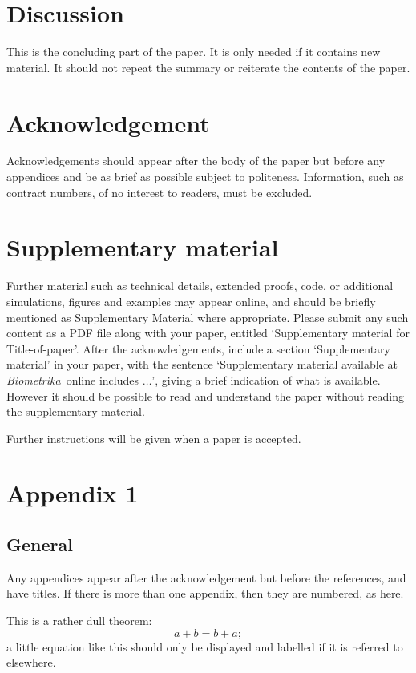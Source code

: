 \documentclass[lineno]{biometrika}
\def\Bka{{\it Biometrika}}
\begin{document}
\section{Discussion}

This is the concluding part of the paper.  It is only needed if it contains new material.
It  should not repeat the summary or reiterate the contents of the paper.

\section*{Acknowledgement}
Acknowledgements should appear after the body of the paper but before any appendices and be as brief as possible
subject to politeness. Information, such as contract numbers, of no interest to readers, must
be excluded.

\section*{Supplementary material}
\label{SM}
Further material such as technical details, extended proofs, code, or additional  simulations, figures and examples may appear online, and should be briefly mentioned as Supplementary Material where appropriate.  Please submit any such content as a PDF file along with your paper, entitled `Supplementary material for Title-of-paper'.  After the acknowledgements, include a section `Supplementary material' in your paper, with the sentence `Supplementary material available at \Bka\ online includes $\ldots$', giving a brief indication of what is available.  However it should be possible to read and understand the paper without reading the supplementary material.

Further instructions will be given when a paper is accepted.


\appendix

\appendixone
\section*{Appendix 1}
\subsection*{General}

Any appendices appear after the acknowledgement but before the references, and have titles. If there is more than one appendix, then they are numbered, as here.

\begin{theorem}
This is a rather dull theorem:
\begin{equation}
\label{A1}
a + b = b + a;
\end{equation}
a little equation like this should only be displayed and labelled if it is referred to elsewhere.
\end{theorem}
\end{document}
